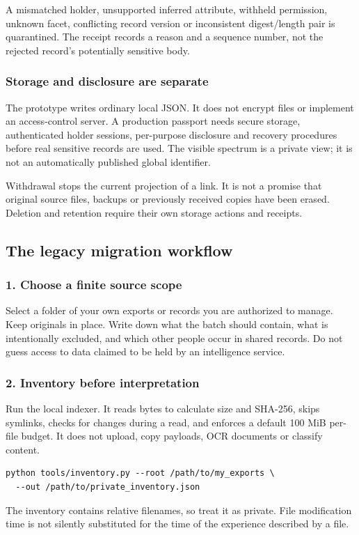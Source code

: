 \documentclass[11pt,a4paper]{article}
\newcommand{\newpagehead}[1]{\clearpage\subsection{#1}}
\begin{document}
A mismatched holder, unsupported inferred attribute, withheld permission, unknown facet, conflicting record version or inconsistent digest/length pair is quarantined. The receipt records a reason and a sequence number, not the rejected record's potentially sensitive body.

\subsubsection{Storage and disclosure are separate}
The prototype writes ordinary local JSON. It does not encrypt files or implement an access-control server. A production passport needs secure storage, authenticated holder sessions, per-purpose disclosure and recovery procedures before real sensitive records are used. The visible spectrum is a private view; it is not an automatically published global identifier.

Withdrawal stops the current projection of a link. It is not a promise that original source files, backups or previously received copies have been erased. Deletion and retention require their own storage actions and receipts.

\newpagehead{The legacy migration workflow}
\subsubsection{1. Choose a finite source scope}
Select a folder of your own exports or records you are authorized to manage. Keep originals in place. Write down what the batch should contain, what is intentionally excluded, and which other people occur in shared records. Do not guess access to data claimed to be held by an intelligence service.

\subsubsection{2. Inventory before interpretation}
Run the local indexer. It reads bytes to calculate size and SHA-256, skips symlinks, checks for changes during a read, and enforces a default 100 MiB per-file budget. It does not upload, copy payloads, OCR documents or classify content.
\begin{lstlisting}
python tools/inventory.py --root /path/to/my_exports \
  --out /path/to/private_inventory.json
\end{lstlisting}
The inventory contains relative filenames, so treat it as private. File modification time is not silently substituted for the time of the experience described by a file.
\end{document}
